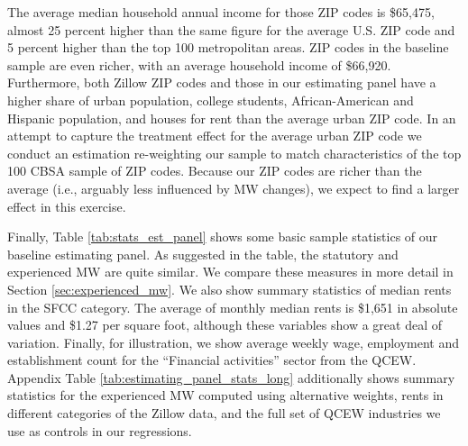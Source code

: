The average median household annual income for those ZIP codes is \$65,475, almost 25 
percent higher than the same figure for the average U.S. ZIP code and 5 percent higher than 
the top 100 metropolitan areas. ZIP codes in the baseline sample are even richer, with an
average household income of \$66,920. Furthermore, both Zillow ZIP codes and those in our 
estimating panel have a higher share of urban population, college students, African-American
and Hispanic population, and houses for rent than the average urban ZIP code. In an attempt 
to capture the treatment effect for the average urban ZIP code we conduct an estimation 
re-weighting our sample to match characteristics of the top 100 CBSA sample of ZIP codes. 
Because our ZIP codes are richer than the average (i.e., arguably less influenced by MW
changes), we expect to find a larger effect in this exercise.

Finally, Table \ref{tab:stats_est_panel} shows some basic sample statistics of our 
baseline estimating panel. As suggested in the table, the statutory and experienced MW 
are quite similar. We compare these measures in more detail in Section \ref{sec:experienced_mw}.
We also show summary statistics of median rents in the SFCC category. The average of 
monthly median rents is \$1,651 in absolute values and \$1.27 per square foot, although 
these variables show a great deal of variation. Finally, for illustration, we show average 
weekly wage, employment and establishment count for the ``Financial activities'' sector 
from the QCEW. Appendix Table \ref{tab:estimating_panel_stats_long} additionally shows 
summary statistics for the experienced MW computed using alternative weights, rents in 
different categories of the Zillow data, and the full set of QCEW industries we use as 
controls in our regressions.
